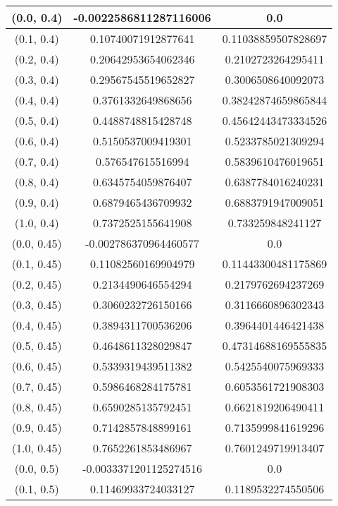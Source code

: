 \begin{table}[H]
\begin{tabular}{|c|c|c|}
\hline
(0.0, 0.4) & -0.0022586811287116006 & 0.0 \\
\hline
(0.1, 0.4) & 0.10740071912877641 & 0.11038859507828697 \\
\hline
(0.2, 0.4) & 0.20642953654062346 & 0.2102723264295411 \\
\hline
(0.3, 0.4) & 0.29567545519652827 & 0.3006508640092073 \\
\hline
(0.4, 0.4) & 0.3761332649868656 & 0.38242874659865844 \\
\hline
(0.5, 0.4) & 0.4488748815428748 & 0.45642443473334526 \\
\hline
(0.6, 0.4) & 0.5150537009419301 & 0.5233785021309294 \\
\hline
(0.7, 0.4) & 0.576547615516994 & 0.5839610476019651 \\
\hline
(0.8, 0.4) & 0.6345754059876407 & 0.6387784016240231 \\
\hline
(0.9, 0.4) & 0.6879465436709932 & 0.6883791947009051 \\
\hline
(1.0, 0.4) & 0.7372525155641908 & 0.733259848241127 \\
\hline
\hline
(0.0, 0.45) & -0.002786370964460577 & 0.0 \\
\hline
(0.1, 0.45) & 0.11082560169904979 & 0.11443300481175869 \\
\hline
(0.2, 0.45) & 0.2134490646554294 & 0.2179762694237269 \\
\hline
(0.3, 0.45) & 0.3060232726150166 & 0.3116660896302343 \\
\hline
(0.4, 0.45) & 0.3894311700536206 & 0.3964401446421438 \\
\hline
(0.5, 0.45) & 0.4648611328029847 & 0.47314688169555835 \\
\hline
(0.6, 0.45) & 0.5339319439511382 & 0.5425540075969333 \\
\hline
(0.7, 0.45) & 0.5986468284175781 & 0.6053561721908303 \\
\hline
(0.8, 0.45) & 0.6590285135792451 & 0.6621819206490411 \\
\hline
(0.9, 0.45) & 0.7142857848899161 & 0.7135999841619296 \\
\hline
(1.0, 0.45) & 0.7652261853486967 & 0.7601249719913407 \\
\hline
\hline
(0.0, 0.5) & -0.0033371201125274516 & 0.0 \\
\hline
(0.1, 0.5) & 0.11469933724033127 & 0.1189532274550506 \\
\hline

\end{tabular}
\end{table}
